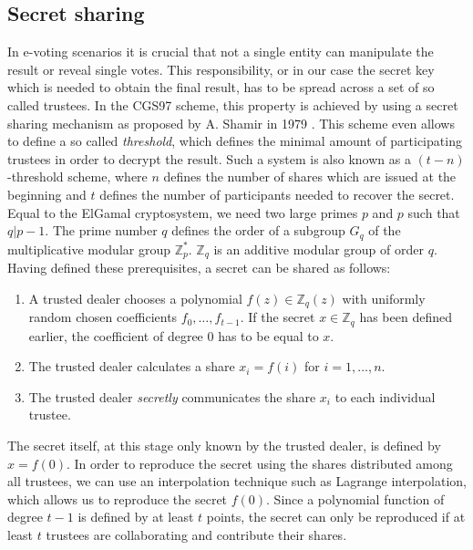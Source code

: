 \documentclass[numbers=noenddot, abstract=on, a4paper, headsepline,
footsepline, oneside, draft=off]{scrreprt}
\begin{document}
\subsection{Secret sharing}
\label{sec:secretsharing}
In e-voting scenarios it is crucial that not a
single entity can manipulate the result or reveal single votes. This
responsibility, or in our case the secret key which is needed to obtain the
final result, has to be spread across a set of so called trustees. In the CGS97
scheme, this property is achieved by using a secret sharing mechanism as
proposed by A. Shamir in 1979 \cite{Shamir79}. This scheme even allows to define a so called
\textit{threshold}, which defines the minimal amount of participating trustees
in order to decrypt the result. Such a system is also known as a
$(t-n)$-threshold scheme, where $n$ defines the number of shares which are
issued at the beginning and $t$ defines the number of participants needed to
recover the secret. Equal to the ElGamal cryptosystem, we need two large primes
$p$ and $p$ such that $q|p-1$. The prime number $q$ defines the order of a
subgroup $G_q$ of the multiplicative modular group $\mathbb{Z}^*_p$.
$\mathbb{Z}_q$ is an additive modular group of order $q$. Having defined these
prerequisites, a secret can be shared as follows:
\begin{enumerate}
  \item A trusted dealer chooses a polynomial $f(z) \in \mathbb{Z}_q(z)$ with
  uniformly random chosen coefficients $f_0, \ldots, f_{t-1}$.
  If the secret $x \in \mathbb{Z}_q$ has been defined earlier, the coefficient of degree $0$ has to
  be equal to $x$.
  \item The trusted dealer calculates a share $x_i = f(i)$ for $i = 1,\ldots,
  n$.
  \item The trusted dealer \emph{secretly} communicates the share $x_i$ to each
  individual trustee.
\end{enumerate}

The secret itself, at this stage only known by the trusted dealer, is defined by
$x=f(0)$. In order to reproduce the secret using the shares distributed among
all trustees, we can use an interpolation technique such as Lagrange
interpolation, which allows us to reproduce the secret $f(0)$. Since a
polynomial function of degree $t-1$ is defined by at least $t$ points, the
secret can only be reproduced if at least $t$ trustees are collaborating and
contribute their shares.
\end{document}
